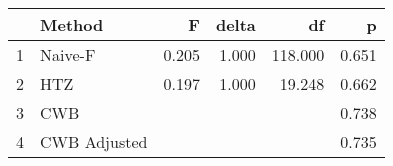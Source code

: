 \begin{table}[ht]
\centering
\begin{tabular}{rlrrrr}
  \hline
 & Method & F & delta & df & p \\ 
  \hline
1 & Naive-F & 0.205 & 1.000 & 118.000 & 0.651 \\ 
  2 & HTZ & 0.197 & 1.000 & 19.248 & 0.662 \\ 
  3 & CWB &  &  &  & 0.738 \\ 
  4 & CWB Adjusted &  &  &  & 0.735 \\ 
   \hline
\end{tabular}
\end{table}

